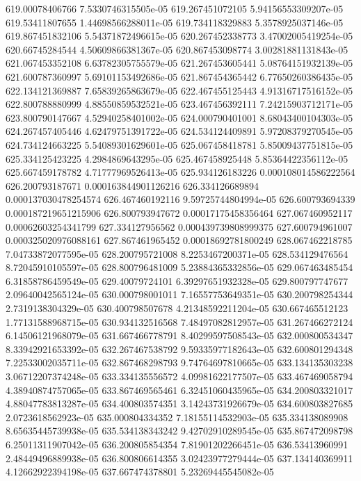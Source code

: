 {619.00078406766 7.5330746315505e-05
619.267451072105 5.94156553309207e-05
619.53411807655 1.44698566288011e-05
619.734118329883 5.3578925037146e-05
619.867451832106 5.54371872496615e-05
620.267452338773 3.47002005419254e-05
620.66745284544 4.50609866381367e-05
620.867453098774 3.00281881131843e-05
621.067453352108 6.63782305755579e-05
621.267453605441 5.08764151932139e-05
621.600787360997 5.69101153492686e-05
621.867454365442 6.77650260386435e-05
622.134121369887 7.65839265863679e-05
622.467455125443 4.91316717516152e-05
622.800788880999 4.88550859532521e-05
623.467456392111 7.24215903712171e-05
623.800790147667 4.52940258401002e-05
624.000790401001 8.68043400104303e-05
624.267457405446 4.62479751391722e-05
624.534124409891 5.97208379270545e-05
624.734124663225 5.54089301629601e-05
625.067458418781 5.85009437751815e-05
625.334125423225 4.2984869643295e-05
625.467458925448 5.85364422356112e-05
625.667459178782 4.71777969526413e-05
625.934126183226 0.000108014586222564
626.200793187671 0.000163844901126216
626.334126689894 0.000137030478254574
626.467460192116 9.59725744804994e-05
626.600793694339 0.000187219651215906
626.800793947672 0.00017175458356464
627.067460952117 0.00062603254341799
627.334127956562 0.000439739808999375
627.600794961007 0.000325020976088161
627.867461965452 0.00018692781800249
628.067462218785 7.04733872077595e-05
628.200795721008 8.2253467200371e-05
628.534129476564 8.72045910105597e-05
628.800796481009 5.23884365332856e-05
629.067463485454 6.31858786459549e-05
629.40079724101 6.39297651932328e-05
629.800797747677 2.09640042565124e-05
630.000798001011 7.16557753649351e-05
630.200798254344 2.7319138304329e-05
630.400798507678 4.21348592211204e-05
630.667465512123 1.77131588968715e-05
630.934132516568 7.48497082812957e-05
631.267466272124 6.14506121968079e-05
631.667466778791 8.40299597508543e-05
632.000800534347 8.33942921653392e-05
632.267467538792 9.59335977182643e-05
632.600801294348 7.22533002035711e-05
632.867468298793 9.74764697810665e-05
633.134135303238 3.06712207374248e-05
633.334135556572 4.09981622177507e-05
633.467469058794 4.38940874757065e-05
633.867469565461 6.32451060435965e-05
634.200803321017 4.88047783813287e-05
634.400803574351 3.14243731926679e-05
634.600803827685 2.0723618562923e-05
635.000804334352 7.18155114532903e-05
635.334138089908 8.65635445739938e-05
635.534138343242 9.42702910289545e-05
635.867472098798 6.25011311907042e-05
636.200805854354 7.81901202266451e-05
636.53413960991 2.48449496889938e-05
636.800806614355 3.02423977279444e-05
637.134140369911 4.12662922394198e-05
637.667474378801 5.23269445545082e-05
}
